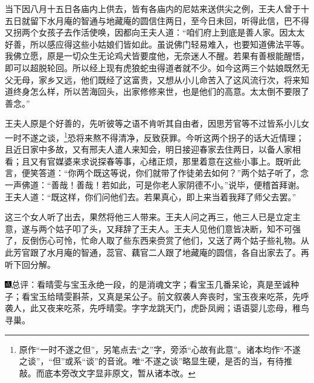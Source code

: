 当下因八月十五日各庙内上供去，皆有各庙内的尼姑来送供尖之例，王夫人曾于十五日就留下水月庵的智通与地藏庵的圆信住两日，至今日未回，听得此信，巴不得又拐两个女孩子去作活使唤，因都向王夫人道：“咱们府上到底是善人家。因太太好善，所以感应得这些小姑娘们皆如此。虽说佛门轻易难入，也要知道佛法平等。我佛立愿，原是一切众生无论鸡犬皆要度他，无奈迷人不醒。若果有善根能醒悟，即可以超脱轮回。所以经上现有虎狼蛇虫得道者就不少。如今这两三个姑娘既然无父无母，家乡又远，他们既经了这富贵，又想从小儿命苦入了这风流行次，将来知道终身怎么样，所以苦海回头，出家修修来世，也是他们的高意。太太倒不要限了善念。”

王夫人原是个好善的，先听彼等之语不肯听其自由者，因思芳官等不过皆系小儿女一时不遂之谈，\footnote{原作“一时不遂之但”，另笔点去“之”字，旁添“心故有此意”。诸本均作“不遂之谈”，“但”或系“谈”的音讹。唯“不遂之谈”略显生硬，是否的当，有待推敲。而底本旁改文字显非原文，暂从诸本改。}恐将来熬不得清净，反致获罪。今听这两个拐子的话大近情理；且近日家中多故，又有邢夫人遣人来知会，明日接迎春家去住两日，以备人家相看；且又有官媒婆来求说探春等事，心绪正烦，那里着意在这些小事上。既听此言，便笑答道：“你两个既这等说，你们就带了作徒弟去如何？”两个姑子听了，念一声佛道：“善哉！善哉！若如此，可是你老人家阴德不小。”说毕，便稽首拜谢。王夫人道：“既这样，你们问他们去。若果真心，即上来当着我拜了师父去罢。”

这三个女人听了出去，果然将他三人带来。王夫人问之再三，他三人已是立定主意，遂与两个姑子叩了头，又拜辞了王夫人。王夫人见他们意皆决断，知不可强了，反倒伤心可怜，忙命人取了些东西来赍赏了他们，又送了两个姑子些礼物。从此芳官跟了水月庵的智通，蕊官、藕官二人跟了地藏庵的圆信，各自出家去了。再听下回分解。

{\includegraphics[width=3mm]{../Images/00005}\kaishu 总评：看晴雯与宝玉永绝一段，的是消魂文字；看宝玉几番呆论，真是至诚种子；看宝玉给晴雯斟茶，又真是呆公子。前文叙袭人奔丧时，宝玉夜来吃茶，先呼袭人，此又夜来吃茶，先呼晴雯。字字龙跳天门，虎卧凤阙；语语婴儿恋母，稚鸟寻巢。}
